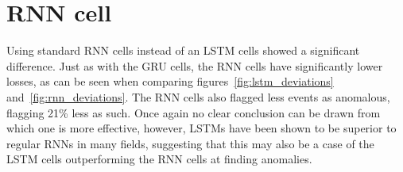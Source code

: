 \section{RNN cell}
Using standard RNN cells instead of an LSTM cells showed a significant difference. Just as with the GRU cells, the RNN cells have significantly lower losses, as can be seen when comparing figures~\ref{fig:lstm_deviations} and~\ref{fig:rnn_deviations}. The RNN cells also flagged less events as anomalous, flagging 21\% less as such. Once again no clear conclusion can be drawn from which one is more effective, however, LSTMs have been shown to be superior to regular RNNs in many fields, suggesting that this may also be a case of the LSTM cells outperforming the RNN cells at finding anomalies.